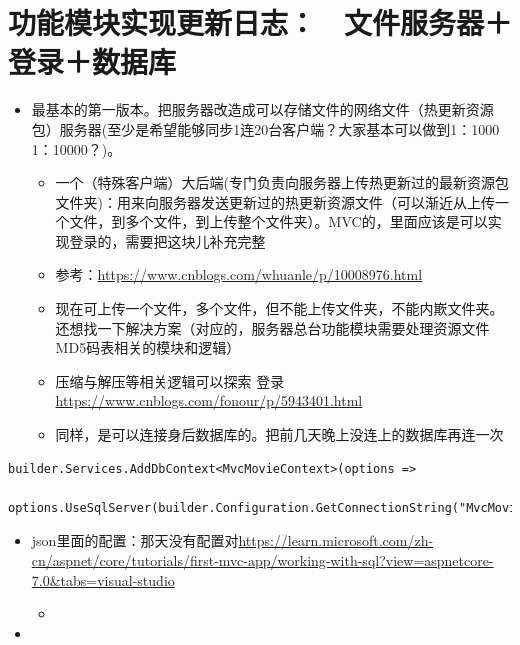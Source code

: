 \documentclass[9pt, b5paper]{article}
\begin{document}
\section{功能模块实现更新日志：　文件服务器＋登录＋数据库}
\label{sec-7}
\begin{itemize}
\item 最基本的第一版本。把服务器改造成可以存储文件的网络文件（热更新资源包）服务器(至少是希望能够同步1连20台客户端？大家基本可以做到1：1000  1：10000？)。
\begin{itemize}
\item 一个（特殊客户端）大后端(专门负责向服务器上传热更新过的最新资源包文件夹)：用来向服务器发送更新过的热更新资源文件（可以渐近从上传一个文件，到多个文件，到上传整个文件夹）。MVC的，里面应该是可以实现登录的，需要把这块儿补充完整
\item 参考：\url{https://www.cnblogs.com/whuanle/p/10008976.html}
\item 现在可上传一个文件，多个文件，但不能上传文件夹，不能内㠌文件夹。还想找一下解决方案（对应的，服务器总台功能模块需要处理资源文件MD5码表相关的模块和逻辑）
\item 压缩与解压等相关逻辑可以探索 登录　 \url{https://www.cnblogs.com/fonour/p/5943401.html}
\item 同样，是可以连接身后数据库的。把前几天晚上没连上的数据库再连一次
\end{itemize}
\end{itemize}
\begin{verbatim}
builder.Services.AddDbContext<MvcMovieContext>(options =>
    options.UseSqlServer(builder.Configuration.GetConnectionString("MvcMovieContext")));
\end{verbatim}
\begin{itemize}
\item json里面的配置：那天没有配置对\url{https://learn.microsoft.com/zh-cn/aspnet/core/tutorials/first-mvc-app/working-with-sql?view=aspnetcore-7.0&tabs=visual-studio}
\begin{itemize}
\item 
\end{itemize}
\item 
\end{itemize}
\end{document}
